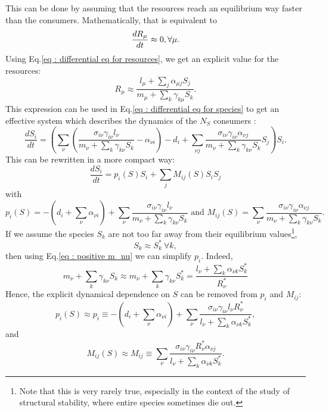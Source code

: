 \documentclass[12pt, titlepage]{report}
\begin{document}
This can be done by assuming that the resources reach an equilibrium way faster than the consumers.
Mathematically, that is equivalent to
\begin{equation}
  \frac{dR_\mu}{dt} \approx 0, \\ \forall \mu.
\end{equation}
Using Eq.\eqref{eq : differential eq for resources}, we get an explicit value for the resources:
\begin{equation}
  R_\mu \approx \frac{l_\mu+\sum_j \alpha_{\mu j}S_j}{m_\mu + \sum_k \gamma_{k\mu}S_k}.
\end{equation}
This expression can be used in Eq.\eqref{eq : differential eq for species} to get an effective system which describes the dynamics of the $N_S$ consumers :
\begin{equation}
  \frac{dS_i}{dt} = \left(\sum_\nu \left(\frac{\sigma_{i\nu}\gamma_{i\nu}l_\nu}{m_\nu+\sum_k \gamma_{k\nu}S_k} - \alpha_{\nu i}\right) -d_i + \sum_{\nu j} \frac{\sigma_{i\nu}\gamma_{i\nu}\alpha_{\nu j}}{m_\nu+\sum_{k}\gamma_{k\nu}S_k}S_j \right) S_i.
\end{equation}
This can be rewritten in a more compact way:
\begin{equation}
  \frac{dS_i}{dt} = p_i(S) S_i + \sum_j M_{ij}(S)S_i S_j \label{eq : effective equations of evolution}
\end{equation}
with
\begin{equation}
    p_i(S) = -\left(d_i+\sum_{\nu}\alpha_{\nu i}\right) + \sum_\nu \frac{\sigma_{i\nu}\gamma_{i\nu}l_\nu}{m_\nu+\sum_k \gamma_{k\nu}S_k}\text{ and } M_{ij}(S)=\sum_{\nu}\frac{\sigma_{i\nu}\gamma_{i\nu}\alpha_{\nu j}}{m_\nu+\sum_{k}\gamma_{k\nu}S_k}.
\end{equation}
If we assume the species $S_k$ are not too far away from their equilibrium values\footnote{Note that this is very rarely true, especially in the context of the study of structural stability, where entire species sometimes die out.}, \ie
\begin{equation}
S_k \approx S^*_k \ \forall k,
\end{equation}
then using Eq.\eqref{eq : positive m_nu} we can simplify $p_i$. Indeed,
\begin{equation}
m_\nu + \sum_k \gamma_{k\nu} S_k \approx m_\nu + \sum_k \gamma_{k\nu}S^*_k = \frac{l_\nu + \sum_k \alpha_{\nu k}S^*_k}{R^*_\nu} \label{eq : equality fluxes resource}
\end{equation}
Hence, the explicit dynamical dependence on $S$ can be removed from $p_i$ and $M_{ij}$:
\begin{equation}
p_i(S) \approx p_i \equiv - \left(d_i + \sum_\nu \alpha_{\nu i}\right) + \sum_\nu \frac{\sigma_{i\nu}\gamma_{i\nu}l_\nu R^*_\nu}{l_\nu + \sum_k \alpha_{\nu k}S^*_k},
\end{equation} and
\begin{equation}
M_{ij}(S) \approx M_{ij} \equiv \sum_\nu \frac{\sigma_{i\nu} \gamma_{i\nu} R^*_\nu \alpha_{\nu j}}{l_\nu + \sum_k{\alpha_{\nu k} S^*_k}}.
\end{equation}
\end{document}
